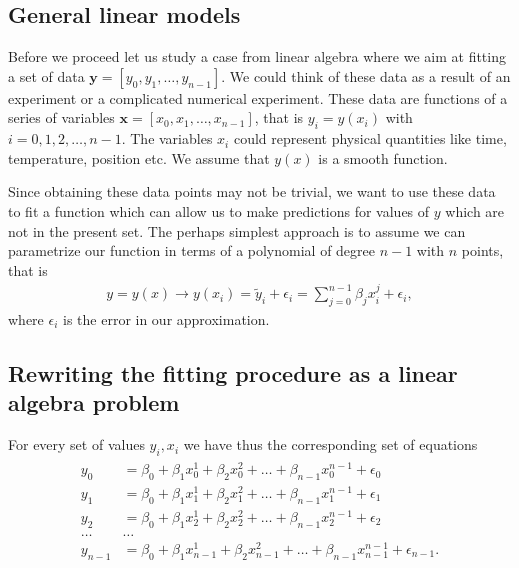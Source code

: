 \documentclass[letterpaper,10pt,english]{sphinxmanual}
\begin{document}
\subsection{General linear models}
\label{\detokenize{chapter4:general-linear-models}}
Before we proceed let us study a case from linear algebra where we aim at fitting a set of data \(\boldsymbol{y}=[y_0,y_1,\dots,y_{n-1}]\). We could think of these data as a result of an experiment or a complicated numerical experiment. These data are functions of a series of variables \(\boldsymbol{x}=[x_0,x_1,\dots,x_{n-1}]\), that is \(y_i = y(x_i)\) with \(i=0,1,2,\dots,n-1\). The variables \(x_i\) could represent physical quantities like time, temperature, position etc. We assume that \(y(x)\) is a smooth function.

Since obtaining these data points may not be trivial, we want to use these data to fit a function which can allow us to make predictions for values of \(y\) which are not in the present set. The perhaps simplest approach is to assume we can parametrize our function in terms of a polynomial of degree \(n-1\) with \(n\) points, that is
\begin{equation*}
\begin{split}
y=y(x) \rightarrow y(x_i)=\tilde{y}_i+\epsilon_i=\sum_{j=0}^{n-1} \beta_j x_i^j+\epsilon_i,
\end{split}
\end{equation*}
where \(\epsilon_i\) is the error in our approximation.


\subsection{Rewriting the fitting procedure as a linear algebra problem}
\label{\detokenize{chapter4:rewriting-the-fitting-procedure-as-a-linear-algebra-problem}}
For every set of values \(y_i,x_i\) we have thus the corresponding set of equations
\begin{equation*}
\begin{split}
\begin{align*}
y_0&=\beta_0+\beta_1x_0^1+\beta_2x_0^2+\dots+\beta_{n-1}x_0^{n-1}+\epsilon_0\\
y_1&=\beta_0+\beta_1x_1^1+\beta_2x_1^2+\dots+\beta_{n-1}x_1^{n-1}+\epsilon_1\\
y_2&=\beta_0+\beta_1x_2^1+\beta_2x_2^2+\dots+\beta_{n-1}x_2^{n-1}+\epsilon_2\\
\dots & \dots \\
y_{n-1}&=\beta_0+\beta_1x_{n-1}^1+\beta_2x_{n-1}^2+\dots+\beta_{n-1}x_{n-1}^{n-1}+\epsilon_{n-1}.\\
\end{align*}
\end{split}
\end{equation*}
\end{document}
